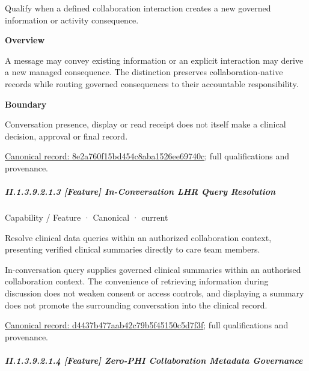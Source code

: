 Qualify when a defined collaboration interaction creates a new governed information or activity consequence.



\textbf{Overview}



A message may convey existing information or an explicit interaction may derive a new managed consequence. The distinction preserves collaboration-native records while routing governed consequences to their accountable responsibility.



\textbf{Boundary}



Conversation presence, display or read receipt does not itself make a clinical decision, approval or final record.


{\footnotesize \href{../../../../continuum/strategy/capability/feature/8e2a760f15bd454c8aba1526ee69740c.md}{Canonical record: 8e2a760f15bd454c8aba1526ee69740c}; full qualifications and provenance.}\par
\subparagraph*{II.1.3.9.2.1.3 [Feature] In-Conversation LHR Query Resolution}
\label{navigation:II.1.3.9.2.1.3}

\label{element:d4437b477aab42c79b5f45150c5d7f3f}
{\small Capability / Feature · Canonical · current}\par

Resolve clinical data queries within an authorized collaboration context, presenting verified clinical summaries directly to care team members.



In-conversation query supplies governed clinical summaries within an authorised collaboration context. The convenience of retrieving information during discussion does not weaken consent or access controls, and displaying a summary does not promote the surrounding conversation into the clinical record.


{\footnotesize \href{../../../../continuum/strategy/capability/feature/d4437b477aab42c79b5f45150c5d7f3f.md}{Canonical record: d4437b477aab42c79b5f45150c5d7f3f}; full qualifications and provenance.}\par
\subparagraph*{II.1.3.9.2.1.4 [Feature] Zero-PHI Collaboration Metadata Governance}
\label{navigation:II.1.3.9.2.1.4}

